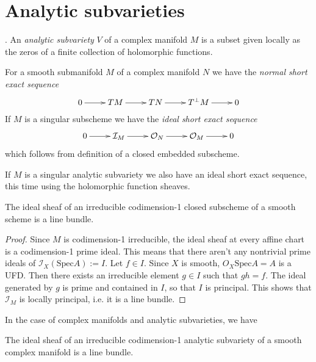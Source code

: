 \section{Analytic subvarieties}
\label{section-analytic-subvarieties}

\begin{definition}
\label{definition-analytic-subvariety}
\cite{gri}. An {\it analytic subvariety} $V$ of a complex manifold $M$ is a
subset given locally as the zeros of a finite collection of holomorphic
functions.
\end{definition}

For a smooth submanifold $M$ of a complex manifold $N$ we have the {\it normal 
short exact sequence}
$$
\xymatrix{
0\ar[r]&TM\ar[r]&TN\ar[r]&T^\perp M\ar[r]&0
}
$$
If $M$ is a singular subscheme we have the {\it ideal short exact sequence}
$$
\xymatrix{
0\ar[r]&\mathcal{I}_M\ar[r]&\mathcal{O}_N\ar[r]&\mathcal{O}_M\ar[r]&0
}
$$
which follows from definition of a closed embedded subscheme.

If $M$ is a singular analytic subvariety we also have an ideal short exact
sequence, this time using the holomorphic function sheaves.

\begin{lemma}
\label{lemma-ideal-sheaf-is-line-bundle-schemes}
The ideal sheaf of an irreducible codimension-1 closed subscheme of a smooth
scheme is a line bundle.
\end{lemma}

\begin{proof}
Since $M$ is codimension-1 irreducible, the ideal sheaf at every affine chart is
a codimension-1 prime ideal. This means that there aren't any nontrivial prime
ideals of $\mathcal{I}_X(\text{Spec}A):=I$. Let $f\in I$.
Since $X$ is smooth, $O_X\text{Spec}A=A$ is a UFD. Then there exists an
irreducible element $g\in I$ such that $gh=f$. The ideal generated by $g$ is
prime and contained in $I$, so that $I$ is principal. This shows that
$\mathcal{I}_M$ is locally principal, i.e. it is a line bundle.
\end{proof}

In the case of complex manifolds and analytic subvarieties, we have

\begin{lemma}
\label{lemma-ideal-sheaf-is-line-bundle-analytic-varieties}
The ideal sheaf of an irreducible codimension-1 analytic subvariety of a smooth
complex manifold is a line bundle.
\end{lemma}

